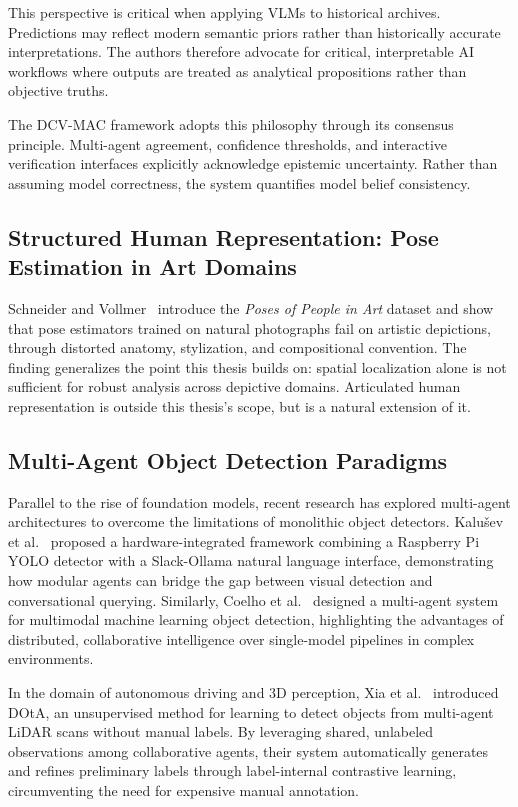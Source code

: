 \documentclass[12pt,a4paper]{report}
\begin{document}
This perspective is critical when applying VLMs to historical archives. Predictions may reflect modern semantic priors rather than historically accurate interpretations. The authors therefore advocate for critical, interpretable AI workflows where outputs are treated as analytical propositions rather than objective truths.

The DCV-MAC framework adopts this philosophy through its consensus principle. Multi-agent agreement, confidence thresholds, and interactive verification interfaces explicitly acknowledge epistemic uncertainty. Rather than assuming model correctness, the system quantifies model belief consistency.

\subsection{Structured Human Representation: Pose Estimation in Art Domains}
Schneider and Vollmer~\cite{schneider_vollmer_2024_popia} introduce the \textit{Poses of People in Art} dataset and show that pose estimators trained on natural photographs fail on artistic depictions, through distorted anatomy, stylization, and compositional convention. The finding generalizes the point this thesis builds on: spatial localization alone is not sufficient for robust analysis across depictive domains. Articulated human representation is outside this thesis's scope, but is a natural extension of it.

\subsection{Multi-Agent Object Detection Paradigms}
Parallel to the rise of foundation models, recent research has explored multi-agent architectures to overcome the limitations of monolithic object detectors. Kalu\v{s}ev et al.~\cite{kalusev_multiagent} proposed a hardware-integrated framework combining a Raspberry Pi YOLO detector with a Slack-Ollama natural language interface, demonstrating how modular agents can bridge the gap between visual detection and conversational querying. Similarly, Coelho et al.~\cite{coelho2023multiagent} designed a multi-agent system for multimodal machine learning object detection, highlighting the advantages of distributed, collaborative intelligence over single-model pipelines in complex environments.

In the domain of autonomous driving and 3D perception, Xia et al.~\cite{xia2025dota} introduced DOtA, an unsupervised method for learning to detect objects from multi-agent LiDAR scans without manual labels. By leveraging shared, unlabeled observations among collaborative agents, their system automatically generates and refines preliminary labels through label-internal contrastive learning, circumventing the need for expensive manual annotation.
\end{document}
